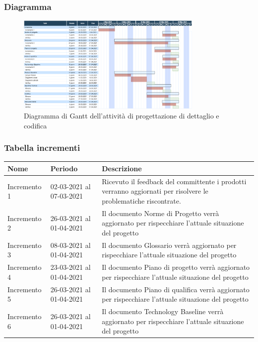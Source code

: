 	\subsubsection{Diagramma}
		\begin{figure}[H]
        		\centering
        		\includegraphics[width=0.8\textwidth]{source/img/Progettazionedettaglio_codifica.png}
        		\caption{Diagramma di Gantt dell'attività di progettazione di dettaglio e codifica}
    		\end{figure}
	\subsubsection{Tabella incrementi}
		\begin{center}
    			\begin{tabular}{ | l | p{5cm} | p{8cm} |}
   			 \hline
    			Nome & Periodo & Descrizione \\ \hline
    			Incremento 1 & 02-03-2021 al 07-03-2021 & Ricevuto il feedback del committente i prodotti verranno aggiornati per risolvere le problematiche riscontrate. \\ \hline
    			Incremento 2 & 26-03-2021 al 01-04-2021 & Il documento Norme di Progetto verrà aggiornato per rispecchiare l'attuale situazione del progetto \\ \hline
    			Incremento 3 & 08-03-2021 al 01-04-2021 & Il documento Glossario verrà aggiornato per rispecchiare l'attuale situazione del progetto \\ \hline
			Incremento 4 & 23-03-2021 al 01-04-2021 & Il documento Piano di progetto verrà aggiornato per rispecchiare l'attuale situazione del progetto \\ \hline
			Incremento 5 & 26-03-2021 al 01-04-2021 & Il documento Piano di qualifica verrà aggiornato per rispecchiare l'attuale situazione del progetto \\ \hline
			Incremento 6 & 26-03-2021 al 01-04-2021 & Il documento Technology Baseline verrà aggiornato per rispecchiare l'attuale situazione del progetto \\ \hline
    			\end{tabular}
		\end{center}

